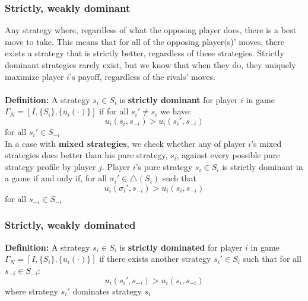 \documentclass{article}
\begin{document}
\subsubsection{Strictly, weakly dominant}
Any strategy where, regardless of what the opposing player does, there is a best move to take. This means that for all of the opposing player(s)' moves, there exists a strategy that is strictly better, regardless of these strategies. Strictly dominant strategies rarely exist, but we know that when they do, they uniquely maximize player $i$'s payoff, regardless of the rivals' moves. \\
\\
\noindent \textbf{Definition:} A strategy $s_i \in S_i$ is \textbf{strictly dominant} for player $i$ in game $\Gamma_N = [I, \{S_i\}, \{u_{i}(\cdot)\}]$ if for all $s_{i}' \neq s_i$ we have: \[
u_{i}(s_{i}, s_{-i}) > u_{i}(s_{i}', s_{-i})
\] 
for all $s_{i}' \in S_{-i}$ \\

\noindent In a case with \textbf{mixed strategies}, we check whether any of player $i$'s mixed strategies does better than his pure strategy, $s_i$, against every possible pure strategy profile by player $j$. Player $i$'s pure strategy $s_i \in S_i$ is strictly dominant in a game if and only if, for all $\sigma_{i}' \in \triangle(S_i)$ such that \[
u_{i}(\sigma_{i}', s_{-i}) > u_{i}(s_{i}, s_{-i})
\]
for all $s_{-i} \in S_{-i}$
 
\subsubsection{Strictly, weakly dominated}

\noindent \textbf{Definition:} A strategy $s_i \in S_i$ is \textbf{strictly dominated }for player $i$ in game $\Gamma_N = [I, \{S_i\}, \{u_{i}(\cdot)\}]$ if there exists another strategy $s_{i}' \in S_i$ such that for all $s_{-i} \in S_{-i}$: \[
u_{i}(s_{i}', s_{-i}) > u_{i}(s_{i}, s_{-i})
\] 
where strategy $s_{i}'$ dominates strategy $s_i$
\end{document}
